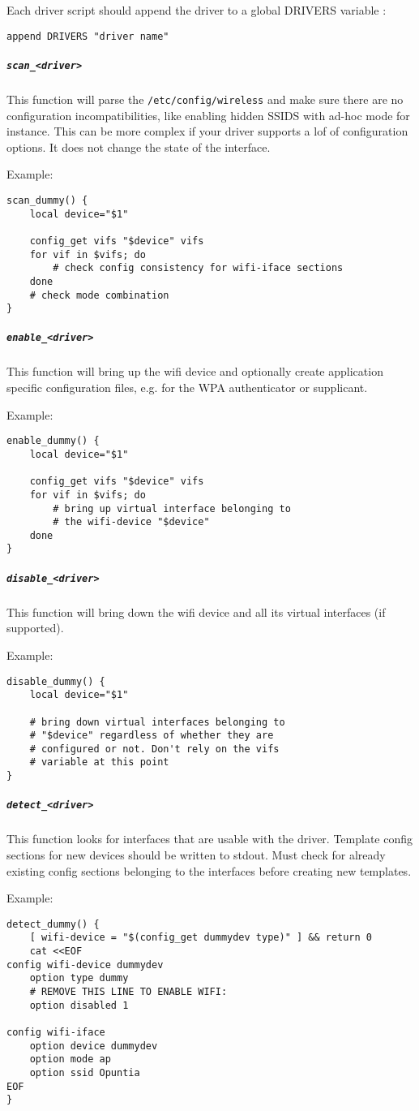 Each driver script should append the driver to a global DRIVERS variable :

\begin{Verbatim}
append DRIVERS "driver name"
\end{Verbatim}

\subparagraph{\texttt{scan\_<driver>}}

This function will parse the \texttt{/etc/config/wireless} and make sure there
are no configuration incompatibilities, like enabling hidden SSIDS with ad-hoc mode
for instance. This can be more complex if your driver supports a lof of configuration
options. It does not change the state of the interface.

Example:
\begin{Verbatim}
scan_dummy() {
	local device="$1"

	config_get vifs "$device" vifs
	for vif in $vifs; do
		# check config consistency for wifi-iface sections
	done
	# check mode combination
}
\end{Verbatim}

\subparagraph{\texttt{enable\_<driver>}}

This function will bring up the wifi device and optionally create application specific
configuration files, e.g. for the WPA authenticator or supplicant.

Example:
\begin{Verbatim}
enable_dummy() {
	local device="$1"

	config_get vifs "$device" vifs
	for vif in $vifs; do
		# bring up virtual interface belonging to
		# the wifi-device "$device"
	done
}
\end{Verbatim}

\subparagraph{\texttt{disable\_<driver>}}

This function will bring down the wifi device and all its virtual interfaces (if supported).

Example:
\begin{Verbatim}
disable_dummy() {
	local device="$1"

	# bring down virtual interfaces belonging to
	# "$device" regardless of whether they are
	# configured or not. Don't rely on the vifs
	# variable at this point
}
\end{Verbatim}

\subparagraph{\texttt{detect\_<driver>}}

This function looks for interfaces that are usable with the driver. Template config sections
for new devices should be written to stdout. Must check for already existing config sections
belonging to the interfaces before creating new templates.

Example:
\begin{Verbatim}
detect_dummy() {
	[ wifi-device = "$(config_get dummydev type)" ] && return 0
	cat <<EOF
config wifi-device dummydev
	option type dummy
	# REMOVE THIS LINE TO ENABLE WIFI:
	option disabled 1

config wifi-iface
	option device dummydev
	option mode ap
	option ssid Opuntia
EOF
}
\end{Verbatim}

